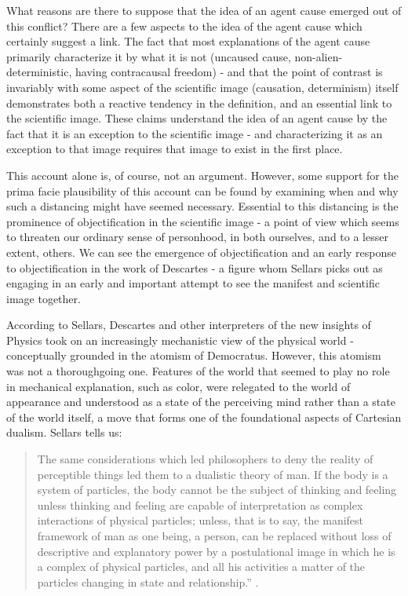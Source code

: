 \documentclass[phd,12pt,oneside,paper=letterpaper]{ubcthesis}
\begin{document}
What reasons are there to suppose that the idea of an agent cause emerged out of this conflict? There are a few aspects to the idea of the agent cause which certainly suggest a link. The fact that most explanations of the agent cause primarily characterize it by what it is not (uncaused cause, non-alien-deterministic, having contracausal freedom) - and that the point of contrast is invariably with some aspect of the scientific image (causation, determinism) itself demonstrates both a reactive tendency in the definition, and an essential link to the scientific image. These claims understand the idea of an agent cause by the fact that it is an exception to the scientific image - and characterizing it as an exception to that image requires that image to exist in the first place.

This account alone is, of course, not an argument. However, some support for the prima facie plausibility of this account can be found by examining when and why such a distancing might have seemed necessary. Essential to this distancing is the prominence of objectification in the scientific image - a point of view which seems to threaten our ordinary sense of personhood, in both ourselves, and to a lesser extent, others. We can see the emergence of objectification and an early response to objectification in the work of Descartes - a figure whom Sellars picks out as engaging in an early and important attempt to see the manifest and scientific image together. 

According to Sellars, Descartes and other interpreters of the new insights of Physics took on an increasingly mechanistic view of the physical world - conceptually grounded in the atomism of Democratus. However, this atomism was not a thoroughgoing one. Features of the world that seemed to play no role in mechanical explanation, such as color, were relegated to the world of appearance and understood as a state of the perceiving mind rather than a state of the world itself, a move that forms one of the foundational aspects of Cartesian dualism. Sellars tells us:

\begin{quote}
The same considerations which led philosophers to deny the reality of perceptible things led them to a dualistic theory of man. If the body is a system of particles, the body cannot be the subject of thinking and feeling unless thinking and feeling are capable of interpretation as complex interactions of physical particles; unless, that is to say, the manifest framework of man as one being, a person, can be replaced without loss of descriptive and explanatory power by a postulational image in which he is a complex of physical particles, and all his activities a matter of the particles changing in state and relationship.'' \citep[p.507-8]{sellars1962}.
\end{quote}
\end{document}
